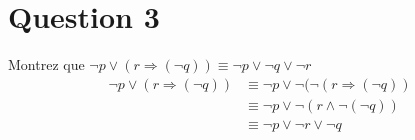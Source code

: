 \section*{Question 3}
Montrez que \(\neg p \vee  (r \Rightarrow (\neg q)) \equiv \neg p \vee \neg q \vee \neg r \)
\bigskip
\begin{align*} 
\neg p \vee (r \Rightarrow (\neg q)) &\equiv \neg p \vee \neg(\neg(r \Rightarrow (\neg q)) \\
&\equiv \neg p \vee \neg(r \wedge \neg(\neg q)) \\
&\equiv \neg p \vee \neg r \vee \neg q
\end{align*}